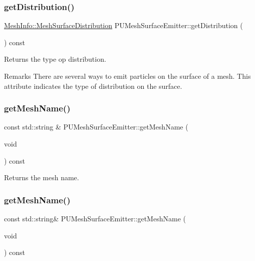 \subsubsection{\texorpdfstring{get\+Distribution()}{getDistribution()}\hspace{0.1cm}{\footnotesize\ttfamily [2/2]}}
{\footnotesize\ttfamily \hyperlink{classMeshInfo_aadc99105abbc3bd033e33c6ba512a13b}{Mesh\+Info\+::\+Mesh\+Surface\+Distribution} P\+U\+Mesh\+Surface\+Emitter\+::get\+Distribution (\begin{DoxyParamCaption}{ }\end{DoxyParamCaption}) const}

Returns the type op distribution. \begin{DoxyRemark}{Remarks}
There are several ways to emit particles on the surface of a mesh. This attribute indicates the type of distribution on the surface. 
\end{DoxyRemark}
\mbox{\label{classPUMeshSurfaceEmitter_a82a6e922aa6a05190bbc4f77e2485a3c}} 
\subsubsection{\texorpdfstring{get\+Mesh\+Name()}{getMeshName()}\hspace{0.1cm}{\footnotesize\ttfamily [1/2]}}
{\footnotesize\ttfamily const std\+::string \& P\+U\+Mesh\+Surface\+Emitter\+::get\+Mesh\+Name (\begin{DoxyParamCaption}\item[{void}]{ }\end{DoxyParamCaption}) const}

Returns the mesh name. \mbox{\label{classPUMeshSurfaceEmitter_a3a50ff04c22061515047634114663200}} 
\subsubsection{\texorpdfstring{get\+Mesh\+Name()}{getMeshName()}\hspace{0.1cm}{\footnotesize\ttfamily [2/2]}}
{\footnotesize\ttfamily const std\+::string\& P\+U\+Mesh\+Surface\+Emitter\+::get\+Mesh\+Name (\begin{DoxyParamCaption}\item[{void}]{ }\end{DoxyParamCaption}) const}

